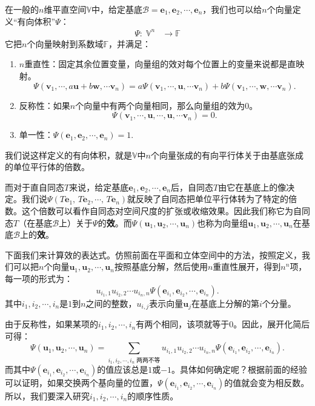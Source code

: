 \documentclass[12pt,UTF8]{ctexbook}
\begin{document}
在一般的$n$维平直空间$\mathbb{V}$中，给定基底$\mathcal{B} = \mathbf{e}_1,\mathbf{e}_2,\cdots,\mathbf{e}_n$，我们也可以给$n$个向量定义“有向体积”$\varPsi$：
\begin{align*}
    \varPsi : \;\mathbb{V}^n &\rightarrow \mathbb{F}  
\end{align*}
它把$n$个向量映射到系数域$\mathbb{F}$，并满足：
\begin{enumerate}
    \item $n$重直性：固定其余位置变量，向量组的效对每个位置上的变量来说都是直映射。
    $$\varPsi(\mathbf{v}_1, \cdots, a\mathbf{u} + b\mathbf{w}, \cdots \mathbf{v}_n) = a\varPsi(\mathbf{v}_1, \cdots, \mathbf{u}, \cdots \mathbf{v}_n) + b\varPsi(\mathbf{v}_1, \cdots, \mathbf{w}, \cdots \mathbf{v}_n).$$
    \item 反称性：如果$n$个向量中有两个向量相同，那么向量组的效为$0$。
    $$ \varPsi(\mathbf{v}_1, \cdots, \mathbf{u}, \cdots, \mathbf{u}, \cdots \mathbf{v}_n) = 0. $$
    \item 单一性：$\varPsi(\mathbf{e}_1, \mathbf{e}_2,\cdots,\mathbf{e}_n) = 1.$
\end{enumerate}
我们说这样定义的有向体积，就是$\mathbb{V}$中$n$个向量张成的有向平行体关于由基底张成的单位平行体的倍数。

而对于直自同态$T$来说，给定基底$\mathbf{e}_1,\mathbf{e}_2, \cdots, \mathbf{e}_n$后，自同态$T$由它在基底上的像决定。我们说$\varPsi(T\mathbf{e}_1, \,T\mathbf{e}_2,\cdots,\,T\mathbf{e}_n)$就反映了自同态把单位平行体转为了特定的倍数。这个倍数可以看作自同态对空间尺度的扩张或收缩效果。因此我们称它为自同态$T$（在基底$\mathcal{B}$上）关于$\varPsi$的\textbf{效}。而$\varPsi(\mathbf{u}_1, \mathbf{u}_2,\cdots,\mathbf{u}_n)$也称为向量组$\mathbf{u}_1, \mathbf{u}_2,\cdots,\mathbf{u}_n$在基底$\mathcal{B}$上的\textbf{效}。

下面我们来计算效的表达式。仿照前面在平面和立体空间中的方法，按照定义，我们可以把$n$个向量$\mathbf{u}_1, \mathbf{u}_2,\cdots,\mathbf{u}_n$按照基底分解，然后使用$n$重直性展开，得到$n^n$项，每一项的形式为：
$$ u_{i_1,1}u_{i_2,2}\cdots u_{i_n,n}\varPsi(\mathbf{e}_{i_1}, \mathbf{e}_{i_2},\cdots,\mathbf{e}_{i_n}).$$
其中$i_1,i_2,\cdots,i_n$是$1$到$n$之间的整数，$u_{i,j}$表示向量$\mathbf{u}_j$在基底上分解的第$i$个分量。

由于反称性，如果某项的$i_1,i_2,\cdots,i_n$有两个相同，该项就等于$0$。因此，展开化简后可得：
$$
\varPsi(\mathbf{u}_1, \mathbf{u}_2,\cdots,\mathbf{u}_n) = \sum_{i_1,i_2,\cdots,i_n\;\mbox{两两不等}} u_{i_1,1}u_{i_2,2}\cdots u_{i_n,n}\varPsi(\mathbf{e}_{i_1}, \mathbf{e}_{i_2},\cdots,\mathbf{e}_{i_n}).
$$
而其中$\varPsi(\mathbf{e}_{i_1}, \mathbf{e}_{i_2},\cdots,\mathbf{e}_{i_n})$的值应该总是$1$或$-1$。具体如何确定呢？根据前面的经验可以证明，如果交换两个基向量的位置，$\varPsi(\mathbf{e}_{i_1}, \mathbf{e}_{i_2},\cdots,\mathbf{e}_{i_n})$的值就会变为相反数。所以，我们要深入研究$i_1,i_2,\cdots,i_n$的顺序性质。
\end{document}
